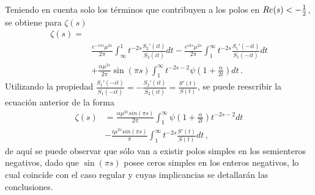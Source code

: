Teniendo en cuenta solo los términos que contribuyen a los polos en  $R{\rm } e(s) < - \frac{1}{2}$, se obtiene para $\zeta (s)$
\begin{align}
\nonumber
	\zeta  (s) =& 	
\\[10pt]
& 
	\frac{e ^{- i \pi s} \mu ^{2s } }{2 \pi}
	\int _{\infty} ^{1} t ^{-2s } 
		\frac{S _2' (it)}{S _2 (it)}
		d t - 
	\frac{e ^{i \pi s} \mu ^{2s}}{2 \pi}
	\int _{1} ^{\infty} t ^{-2s } 
	\frac{S _1 ' (-it)}{S _1 (-it)}
	d t
\nonumber 
	 \\[10pt]
	&  + \frac{\alpha \mu ^{2s} }{2 \pi }	\sin ( \pi s)  \int _1 ^{\infty}
	t ^{-2s-2}  \psi \left( 1 + \frac{\alpha}{2 t}\right) dt 
		\, .
\end{align}
Utilizando la propiedad  $\frac{S _1 ' (-it)}{S _1 (-i t)} = - \frac{S _2 ' (i t)}{S _2 (it)} = \frac{S'(t)}{S(t)}  $, se puede reescribir la ecuación anterior de la forma
\begin{align}
\zeta  (s) &= 
\frac{\alpha \mu ^{2s} sin( \pi s )}{2 \pi } \int _{1} ^{\infty} 
	  \psi \left( 1 + \frac{\alpha}{2 t} \right) 
	   t ^{-2s-2} dt
\\[5pt]
\nonumber
	& -  \frac{i \mu ^{2s}  sin (\pi s)}{\pi} \int _1 ^{\infty} t 			^{-2s} \frac{S'(t)}{S(t)} dt 
	\, ,
\end{align}
de aquí se puede observar que sólo van a existir polos simples en los semienteros negativos, dado que $\sin (\pi s)$ posee ceros simples en los enteros negativos, lo cual coincide con el caso regular y cuyas implicancias se detallarán las conclusiones.



